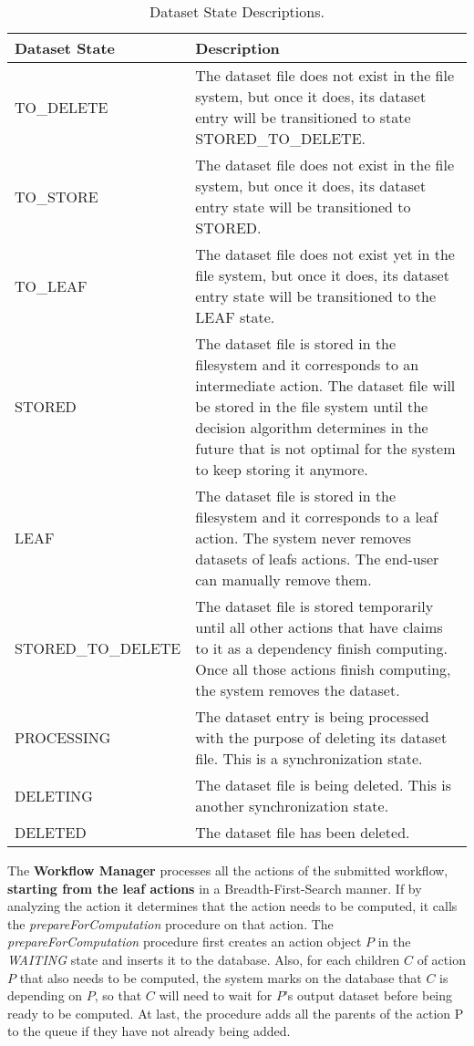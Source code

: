 \begin{table}
\begin{tabular}{| l | p{12cm} |}
\hline
\textbf{Dataset State} & \textbf{Description} \\ \hline
TO\_DELETE & The dataset file does not exist in the file system, but once it does, its dataset entry will be transitioned to state STORED\_TO\_DELETE. \\ \hline
TO\_STORE & The dataset file does not exist in the file system, but once it does, its dataset entry state will be transitioned to STORED. \\ \hline
TO\_LEAF & The dataset file does not exist yet in the file system, but once it does, its dataset entry state will be transitioned to the LEAF state. \\ \hline
STORED & The dataset file is stored in the filesystem and it corresponds to an intermediate action. The dataset file will be stored in the file system until the decision algorithm determines in the future that is not optimal for the system to keep storing it anymore. \\ \hline
LEAF & The dataset file is stored in the filesystem and it corresponds to a leaf action. The system never removes datasets of leafs actions. The end-user can manually remove them.\\ \hline
STORED\_TO\_DELETE & The dataset file is stored temporarily until all other actions that have claims to it as a dependency finish computing. Once all those actions finish computing, the system removes the dataset.  \\ \hline
PROCESSING & The dataset entry is being processed with the purpose of deleting its dataset file. This is a synchronization state. \\ \hline
DELETING & The dataset file is being deleted. This is another synchronization state. \\ \hline
DELETED & The dataset file has been deleted. \\ \hline
\end{tabular}
\caption{Dataset State Descriptions.\label{tab:dataset_states}}
\end{table}

The \textbf{Workflow Manager} processes all the actions of the submitted workflow, \textbf{starting from the leaf actions} in a Breadth-First-Search manner. If by analyzing the action it determines that the action needs to be computed, it calls the \textit{prepareForComputation} procedure on that action.  The \textit{prepareForComputation} procedure first creates an action object $P$ in the \textit{WAITING} state and inserts it to the database. Also, for each children $C$ of action $P$ that also needs to be computed, the system marks on the database that $C$ is depending on $P$, so that $C$ will need to wait for $P$'s output dataset before being ready to be computed. At last, the procedure adds all the parents of the action P to the queue if they have not already being added.

